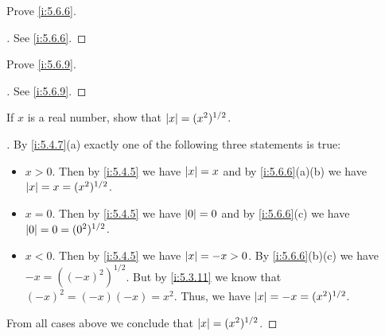 \exercisesection

\begin{ex}\label{i:ex:5.6.1}
  Prove \cref{i:5.6.6}.
\end{ex}

\begin{proof}[]
  See \cref{i:5.6.6}.
\end{proof}

\begin{ex}\label{i:ex:5.6.2}
  Prove \cref{i:5.6.9}.
\end{ex}

\begin{proof}[]
  See \cref{i:5.6.9}.
\end{proof}

\begin{ex}\label{i:ex:5.6.3}
  If \(x\) is a real number, show that \(\left\lvert x\right\rvert = (x^2)^{1 / 2}\).
\end{ex}

\begin{proof}[]
  By \cref{i:5.4.7}(a) exactly one of the following three statements is true:
  \begin{itemize}
    \item \(x > 0\).
          Then by \cref{i:5.4.5} we have \(\left\lvert x\right\rvert = x\) and by \cref{i:5.6.6}(a)(b) we have \(\left\lvert x\right\rvert = x = (x^2)^{1 / 2}\).
    \item \(x = 0\).
          Then by \cref{i:5.4.5} we have \(\left\lvert0\right\rvert = 0\) and by \cref{i:5.6.6}(c) we have \(\left\lvert0\right\rvert = 0 = (0^2)^{1 / 2}\).
    \item \(x < 0\).
          Then by \cref{i:5.4.5} we have \(\left\lvert x\right\rvert = -x > 0\).
          By \cref{i:5.6.6}(b)(c) we have \(-x = ((-x)^2)^{1 / 2}\).
          But by \cref{i:5.3.11} we know that \((-x)^2 = (-x)(-x) = x^2\).
          Thus, we have \(\left\lvert x\right\rvert = -x = (x^2)^{1 / 2}\).
  \end{itemize}
  From all cases above we conclude that \(\left\lvert x\right\rvert = (x^2)^{1 / 2}\).
\end{proof}
